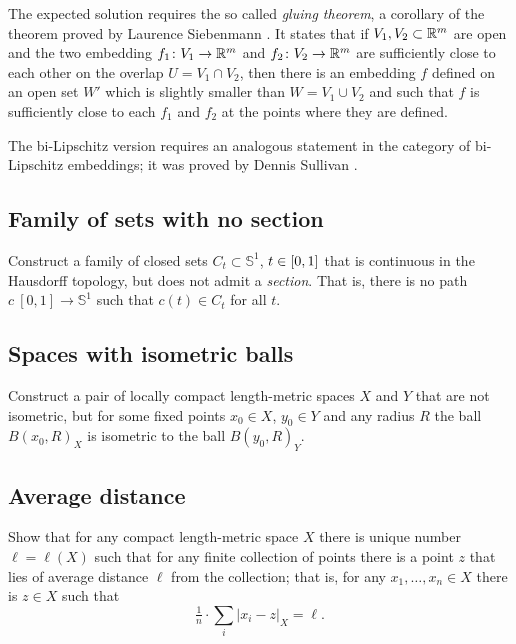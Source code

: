 The expected solution requires the so called \emph{gluing theorem},
a corollary of the theorem proved by Laurence Siebenmann \cite[see][]{siebenmann}.
It states that 
if $V_1, V_2\subset\mathbb{R}^m$ are open
and the two embedding $f_1\colon V_1\to\mathbb{R}^m$ and $f_2\colon V_2\to\mathbb{R}^m$ 
are sufficiently close to each other 
on the overlap $U=V_1\cap V_2$, 
then
there is an embedding $f$ defined on an open set $W'$
which is slightly smaller than $W=V_1\cup V_2$
and such that $f$ is sufficiently close to each $f_1$ and $f_2$ at the points where they are defined.

The  bi-Lipschitz version requires 
an analogous statement in the category of bi-Lipschitz embeddings;
it was proved by
Dennis Sullivan \cite[see][]{sullivan}.

\subsection*{Family of sets with no section\easy}
\label{hausdorff-section} 

\begin{pr}
Construct a family of closed sets $C_t\subset\mathbb{S}^1$, $t\z\in [0,1]$ that is continuous in the Hausdorff topology, 
but does not admit a {}\emph{section}.
That is, there is no path $c\:[0,1]\to \mathbb{S}^1$ such that $c(t)\in C_t$ for all $t$.
\end{pr}

\subsection*{Spaces with isometric balls}

\begin{pr}
Construct a pair of locally compact length-metric spaces $X$ and $Y$ 
that are not isometric,
but for some fixed points $x_0\in X$,  $y_0\in Y$ and any radius $R$
the ball $B(x_0,R)_X$ is 
isometric to the ball $B(y_0,R)_Y$.
\end{pr}

\subsection*{Average distance\easy}

\begin{pr}
Show that for any compact length-metric space $X$ there is unique number $\ell=\ell(X)$ such that for any finite collection of points there is a point $z$ that lies of average distance $\ell$ from the collection;
that is, for any $x_1,\dots,x_n\in X$ there is $z\in X$ such that
\[\tfrac1n\cdot\sum_i|x_i-z|_X=\ell.\]

\end{pr}



